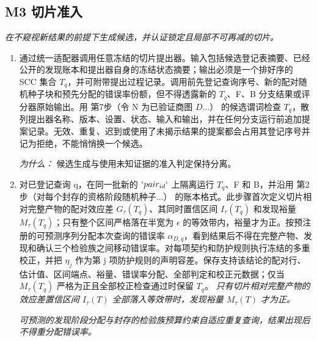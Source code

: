 \documentclass[10pt,a4paper]{article}
\begin{document}
\subsection*{M3 切片准入}
\emph{在不窥视新结果的前提下生成候选，并认证锁定且局部不可再减的切片。}
\begin{enumerate}[leftmargin=*,start=8]
  \item 通过统一适配器调用任意冻结的切片提出器。输入包括候选登记表摘要、已经公开的发现账本和提出器自身的冻结状态摘要；输出必须是一个排好序的 SCC 集合 \(T_{q}\)，并可附带提出过程记录。调用前先登记查询序号、新的配对随机种子块和预先分配的错误率份额，但不得透露新的 \(T_{q}\)、F、B 分支结果或评分器原始输出。用 第7步（令 N 为已验证商图 \(D\dots \)） 的候选谓词检查 \(T_{q}\)，散列提出器名称、版本、设置、状态、输入和输出，并在任何分支运行前追加提案记录。无效、重复、迟到或使用了未揭示结果的提案都会占用其登记序号并记为拒绝，不能悄悄换一个候选。
\par\emph{为什么：} 候选生成与使用未知证据的准入判定保持分离。
  \item 对已登记查询 q，在同一批新的 \(`pair_{id}`\) 上隔离运行 \(T_{q}\)、F 和 B，并沿用 第2步（对每个封存的资格阶段随机种子\(\dots \)） 的账本格式。此步骤首次定义切片相对完整产物的配对效应差 \(G_\tau (T_{q})\)、其同时置信区间 \(I_\tau (T_{q})\) 和发现裕量 \(M_\tau (T_{q})\)；只有整个区间严格落在半宽为 \(\epsilon \) 的等效带内，裕量才为正。按预注册的可预测序列分配本次查询的错误率 \(\alpha _{D,q}\)，看到结果后不得在完整产物、发现和确认三个检验族之间移动错误率。对每项契约和防护规则执行冻结的多重校正，并把 \(\eta _{j}\) 作为第 j 项防护规则的声明容差。保存支持该结论的配对行、估计值、区间端点、裕量、错误率分配、全部判定和校正元数据；仅当 \(M_\tau (T_{q})\) 严格为正且全部校正检查通过时保留 \(T_{q}\)。
\noindent\emph{只有切片相对完整产物的效应差置信区间 \(I_\tau (T)\) 全部落入等效带时，发现裕量 \(M_\tau (T)\) 才为正。}
\par{}
\noindent\emph{可预测的发现阶段分配与封存的检验族预算约束自适应重复查询，结果出现后不得重分配错误率。}
\par{}

\end{enumerate}
\end{document}
